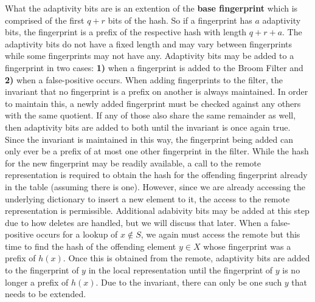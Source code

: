 \documentclass[../paper.tex]{subfiles}
\begin{document}
	What the adaptivity bits are is an extention of the {\bf base fingerprint} which is comprised of the first $q + r$ bits of the hash.  So if a fingerprint has $a$ adaptivity bits, the fingerprint is a prefix of the respective hash with length $q + r + a$. The adaptivity bits do not have a fixed length and may vary between fingerprints while some fingerprints may not have any.  Adaptivity bits may be added to a fingerprint in two cases: {\bf 1)} when a fingerprint is added to the Broom Filter and {\bf 2)} when a false-positive occurs.   When adding fingerprints to the filter, the invariant that no fingerprint is a prefix on another is always maintained.  In order to maintain this, a newly added fingerprint must be checked against any others with the same quotient.  If any of those also share the same remainder as well, then adaptivity bits are added to both until the invariant is once again true.  Since the invariant is maintained in this way, the fingerprint being added can only ever be a prefix of at most one other fingerprint in the filter.   While the hash for the new fingerprint may be readily available, a call to the remote representation is required to obtain the hash for the offending fingerprint already in the table (assuming there is one).  However, since we are already accessing the underlying dictionary to insert a new element to it, the access to the remote representation is permissible.  Additional adabivity bits may be added at this step due to how deletes are handled, but we will discuss that later.  When a false-positive occurs for a lookup of $x \notin S$, we again must access the remote but this time to find the hash of the offending element $y \in X$ whose fingerprint was a prefix of $h(x)$.  Once this is obtained from the remote, adaptivity bits are added to the fingerprint of $y$ in the local representation until the fingerprint of $y$ is no longer a prefix of $h(x)$.  Due to the invariant, there can only be one such $y$ that needs to be extended. 
	
\end{document}
